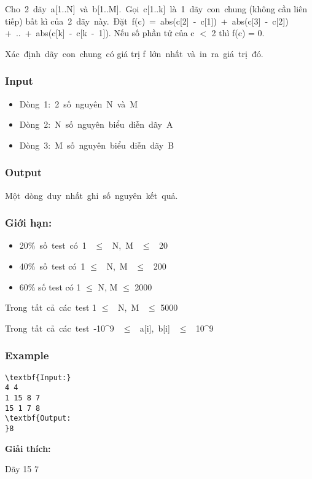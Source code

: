 

Cho 2 dãy a[1..N] và b[1..M]. Gọi c[1..k] là 1 dãy con chung (không cần liên tiếp) bất kì của 2 dãy này. Đặt f(c) = abs(c[2] - c[1]) + abs(c[3] - c[2]) + .. + abs(c[k] - c[k - 1]). Nếu số phần tử của c $<$ 2 thì f(c) = 0.

Xác định dãy con chung có giá trị f lớn nhất và in ra giá trị đó.

\subsubsection{Input}
\begin{itemize}
	\item Dòng 1: 2 số nguyên N và M
	\item Dòng 2: N số nguyên biểu diễn dãy A
	\item Dòng 3: M số nguyên biểu diễn dãy B
\end{itemize}

\subsubsection{Output}

Một dòng duy nhất ghi số nguyên kết quả.

\subsubsection{Giới hạn:}
\begin{itemize}
	\item 20\% số test có 1  $\le$  N, M  $\le$  20
	\item 40\% số test có 1  $\le$  N, M  $\le$  200
	\item 60\% số test có 1  $\le$  N, M  $\le$  2000
\end{itemize}

Trong tất cả các test 1 $\le$  N, M  $\le$  5000

Trong tất cả các test -10\textasciicircum9  $\le$  a[i], b[i]  $\le$  10\textasciicircum9

\subsubsection{Example}
\begin{verbatim}
\textbf{Input:} 
4 4
1 15 8 7
15 1 7 8 
\textbf{Output:
}8\end{verbatim}

\textbf{Giải thích:}

Dãy 15 7

